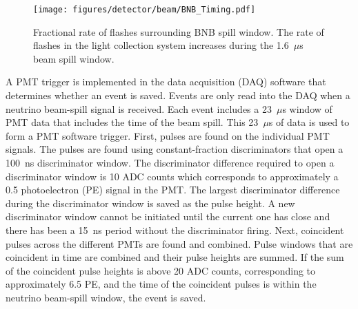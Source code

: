   \begin{figure}[h]
    \centering
    \texttt{[image: figures/detector/beam/BNB\_Timing.pdf]}
    \caption{Fractional rate of flashes surrounding BNB spill window. The
    rate of flashes in the light collection system increases during the
    1.6~$\mu$s beam spill window.}
    \label{fig:bnbtiming}
  \end{figure}

  A PMT trigger is implemented in the data acquisition (DAQ) software that
  determines whether an event is saved. Events are only read into the DAQ
  when a neutrino beam-spill signal is received. Each event includes a
  23~$\mu$s window of PMT data that includes the time of the beam spill.
  This 23~$\mu$s of data is used to form a PMT software trigger. First,
  pulses are found on the individual PMT signals. The pulses are found using
  constant-fraction discriminators that open a 100~ns discriminator window.
  The discriminator difference required to open a discriminator window is 10
  ADC counts which corresponds to approximately a 0.5 photoelectron (PE)
  signal in the PMT. The largest discriminator difference during the
  discriminator window is saved as the pulse height. A new discriminator
  window cannot be initiated until the current one has close and there has
  been a 15~ns period without the discriminator firing.  Next, coincident
  pulses across the different PMTs are found and combined.  Pulse windows
  that are coincident in time are combined and their pulse heights are
  summed. If the sum of the coincident pulse heights is above 20 ADC counts,
  corresponding to approximately 6.5 PE, and the time of the coincident
  pulses is within the neutrino beam-spill window, the event is saved.



